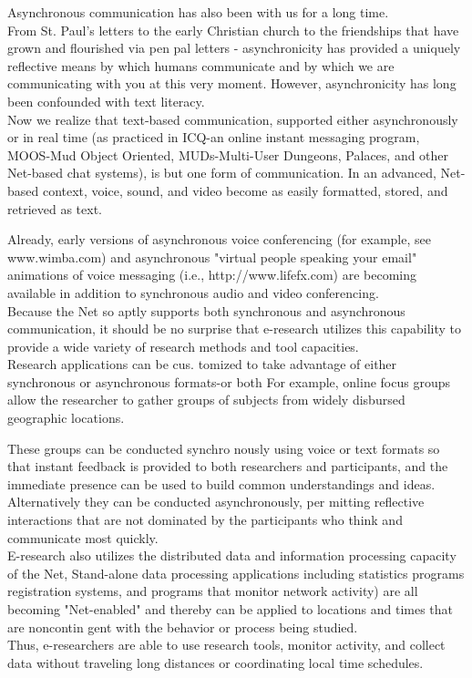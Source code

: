 \documentclass{beamer}
\begin{document}
\begin{frame}
Asynchronous communication has also been with us for a long time. \\
From St. Paul’s
letters to the early Christian church to the friendships that have grown and flourished
via pen pal letters - asynchronicity has provided a uniquely reflective means by which
humans communicate and by which we are communicating with you at this very moment.
However, asynchronicity has long been confounded with text literacy.\\
 Now we
realize that text-based communication, supported either asynchronously or in real time
(as practiced in ICQ-an online instant messaging program, MOOS-Mud Object Oriented,
MUDs-Multi-User Dungeons, Palaces, and other Net-based chat systems), is but one form
of communication. In an advanced, Net-based context, voice, sound, and video become
as easily formatted, stored, and retrieved as text. 
 \end{frame}
 
\begin{frame}
Already, early versions of asynchronous
voice conferencing (for example, see www.wimba.com) and asynchronous "virtual people
speaking your email" animations of voice messaging (i.e., http://www.lifefx.com) are
becoming available in addition to synchronous audio and video conferencing.\\
Because the Net so aptly supports both synchronous and asynchronous communication,
it should be no surprise that e-research utilizes this capability to provide a wide variety
of research methods and tool capacities.\\
 Research applications can be cus. tomized
to take advantage of either synchronous or asynchronous formats-or both For example,
online focus groups allow the researcher to gather groups of subjects from widely disbursed
geographic locations. 
 \end{frame}
 
 
\begin{frame}
These groups can be conducted synchro nously using voice or text
formats so that instant feedback is provided to both researchers and participants, and the
immediate presence can be used to build common understandings and ideas. Alternatively
they can be conducted asynchronously, per mitting reflective interactions that are not
dominated by the participants who think and communicate most quickly.\\
E-research also utilizes the distributed data and information processing capacity of the
Net, Stand-alone data processing applications including statistics programs registration
systems, and programs that monitor network activity) are all becoming "Net-enabled" and
thereby can be applied to locations and times that are noncontin gent with the behavior or
process being studied. \\
Thus, e-researchers are able to use research tools, monitor activity,
and collect data without traveling long distances or coordinating local time schedules.
 \end{frame}
 
\end{document}
